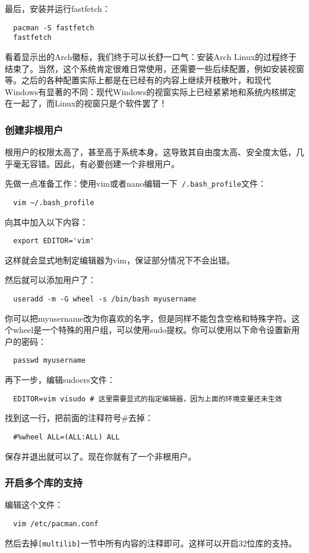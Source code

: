 \documentclass[../main.tex]{subfiles}
\begin{document}
最后，安装并运行fastfetch：
\begin{lstlisting}
  pacman -S fastfetch
  fastfetch
\end{lstlisting}
看着显示出的Arch徽标，我们终于可以长舒一口气：安装Arch Linux的过程终于结束了。当然，这个系统肯定很难日常使用，还需要一些后续配置，例如安装视窗等。之后的各种配置实际上都是在已经有的内容上继续开枝散叶，和现代Windows有显著的不同：现代Windows的视窗实际上已经紧紧地和系统内核绑定在一起了，而Linux的视窗只是个软件罢了！

\subsubsection{创建非根用户}

根用户的权限太高了，甚至高于系统本身。这导致其自由度太高、安全度太低，几乎毫无容错。因此，有必要创建一个非根用户。

先做一点准备工作：使用vim或者nano编辑一下\texttt{~/.bash\_profile}文件：
\begin{lstlisting}
  vim ~/.bash_profile
\end{lstlisting}
向其中加入以下内容：
\begin{lstlisting}
  export EDITOR='vim'
\end{lstlisting}
这样就会显式地制定编辑器为vim，保证部分情况下不会出错。

然后就可以添加用户了：
\begin{lstlisting}
  useradd -m -G wheel -s /bin/bash myusername
\end{lstlisting}
你可以把myusername改为你喜欢的名字，但是同样不能包含空格和特殊字符。这个wheel是一个特殊的用户组，可以使用sudo提权。你可以使用以下命令设置新用户的密码：
\begin{lstlisting}
  passwd myusername
\end{lstlisting}
再下一步，编辑sudoers文件：
\begin{lstlisting}
  EDITOR=vim visudo # 这里需要显式的指定编辑器，因为上面的环境变量还未生效
\end{lstlisting}
找到这一行，把前面的注释符号\#去掉：
\begin{lstlisting}
  #%wheel ALL=(ALL:ALL) ALL
\end{lstlisting}
保存并退出就可以了。现在你就有了一个非根用户。

\subsubsection{开启多个库的支持}

编辑这个文件：
\begin{lstlisting}
  vim /etc/pacman.conf
\end{lstlisting}
然后去掉\texttt{[multilib]}一节中所有内容的注释即可。这样可以开启32位库的支持。
\end{document}
